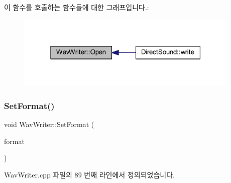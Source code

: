 이 함수를 호출하는 함수들에 대한 그래프입니다.\+:
\nopagebreak
\begin{figure}[H]
\begin{center}
\leavevmode
\includegraphics[width=303pt]{class_wav_writer_a18a057d0c1901caa6b08f528bd6908a7_icgraph}
\end{center}
\end{figure}
\mbox{\label{class_wav_writer_a04fe7187eebeff2831af0bc85470744d}} 
\subsubsection{\texorpdfstring{Set\+Format()}{SetFormat()}}
{\footnotesize\ttfamily void Wav\+Writer\+::\+Set\+Format (\begin{DoxyParamCaption}\item[{\mbox{\hyperlink{getopt1_8c_a2c212835823e3c54a8ab6d95c652660e}{const}} W\+A\+V\+E\+F\+O\+R\+M\+A\+T\+EX $\ast$}]{format }\end{DoxyParamCaption})}



Wav\+Writer.\+cpp 파일의 89 번째 라인에서 정의되었습니다.


